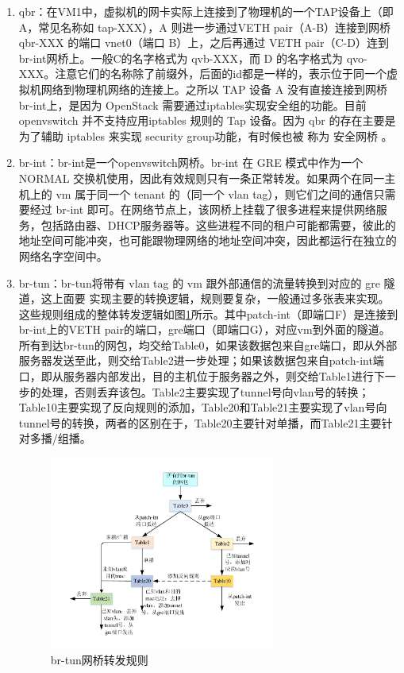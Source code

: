 \begin{enumerate}
\item qbr：在VM1中，虚拟机的网卡实际上连接到了物理机的一个TAP设备上（即 A，常见名称如 tap-XXX），A 则进一步通过VETH pair（A-B）连接到网桥 qbr-XXX 的端口 vnet0（端口 B）上，之后再通过 VETH pair（C-D）连到br-int网桥上。一般C的名字格式为 qvb-XXX，而 D 的名字格式为 qvo-XXX。注意它们的名称除了前缀外，后面的id都是一样的，表示位于同一个虚拟机网络到物理机网络的连接上。之所以 TAP 设备 A 没有直接连接到网桥br-int上，是因为 OpenStack 需要通过iptables实现安全组的功能。目前 openvswitch 并不支持应用iptables 规则的 Tap 设备。因为 qbr 的存在主要是为了辅助 iptables 来实现 security group功能，有时候也被
称为 安全网桥 。
\item br-int：br-int是一个openvswitch网桥。br-int 在 GRE 模式中作为一个 NORMAL 交换机使用，因此有效规则只有一条正常转发。如果两个在同一主机上的 vm 属于同一个 tenant 的（同一个 vlan tag），则它们之间的通信只需要经过 br-int 即可。在网络节点上，该网桥上挂载了很多进程来提供网络服务，包括路由器、DHCP服务器等。这些进程不同的租户可能都需要，彼此的地址空间可能冲突，也可能跟物理网络的地址空间冲突，因此都运行在独立的网络名字空间中。 
\item br-tun：br-tun将带有 vlan tag 的 vm 跟外部通信的流量转换到对应的 gre 隧道，这上面要
实现主要的转换逻辑，规则要复杂，一般通过多张表来实现。这些规则组成的整体转发逻辑如图\ref{fig:br-tun}所示。其中patch-int（即端口F）是连接到br-int上的VETH pair的端口，gre端口（即端口G），对应vm到外面的隧道。所有到达br-tun的网包，均交给Table0，如果该数据包来自gre端口，即从外部服务器发送至此，则交给Table2进一步处理；如果该数据包来自patch-int端口，即从服务器内部发出，目的主机位于服务器之外，则交给Table1进行下一步的处理，否则丢弃该包。Table2主要实现了tunnel号向vlan号的转换；Table10主要实现了反向规则的添加，Table20和Table21主要实现了vlan号向tunnel号的转换，两者的区别在于，Table20主要针对单播，而Table21主要针对多播/组播。

\begin{figure}[!htb]
  \centering
  \includegraphics[width=0.7\textwidth]{logo/br-tun}
  \caption{br-tun网桥转发规则}
  \label{fig:br-tun}
\end{figure}


\end{enumerate}
